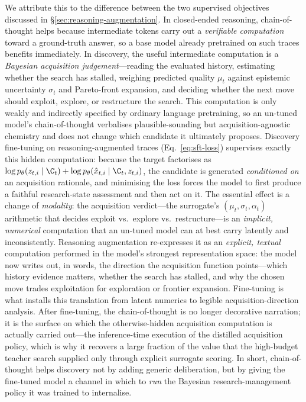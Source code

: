 We attribute this to the difference between the two supervised objectives discussed in
\S\ref{sec:reasoning-augmentation}. In closed-ended reasoning, chain-of-thought helps because intermediate
tokens carry out a \emph{verifiable computation} toward a ground-truth answer, so a base model already
pretrained on such traces benefits immediately. In discovery, the useful intermediate computation is a
\emph{Bayesian acquisition judgement}---reading the evaluated history, estimating whether the search has
stalled, weighing predicted quality $\mu_t$ against epistemic uncertainty $\sigma_t$ and Pareto-front
expansion, and deciding whether the next move should exploit, explore, or restructure the search. This
computation is only weakly and indirectly specified by ordinary language pretraining, so an un-tuned model's
chain-of-thought verbalises plausible-sounding but acquisition-agnostic chemistry and does not change which
candidate it ultimately proposes. Discovery fine-tuning on reasoning-augmented traces
(Eq.~\eqref{eq:sft-loss}) supervises exactly this hidden computation: because the target factorises as
$\log p_\theta(z_{t,i}\mid\C_t) + \log p_\theta(\hat{x}_{t,i}\mid\C_t,z_{t,i})$, the candidate is generated
\emph{conditioned on} an acquisition rationale, and minimising the loss forces the model to first produce a
faithful research-state assessment and then act on it. The essential effect is a change of \emph{modality}:
the acquisition verdict---the surrogate's $(\mu_t,\sigma_t,\alpha_t)$ arithmetic that decides exploit
vs.\ explore vs.\ restructure---is an \emph{implicit, numerical} computation that an un-tuned model can at best
carry latently and inconsistently. Reasoning augmentation re-expresses it as an \emph{explicit, textual}
computation performed in the model's strongest representation space: the model now writes out, in words, the
direction the acquisition function points---which history evidence matters, whether the search has stalled, and
why the chosen move trades exploitation for exploration or frontier expansion. Fine-tuning is what installs this
translation from latent numerics to legible acquisition-direction analysis. After fine-tuning, the
chain-of-thought is no longer decorative narration; it is the surface on which the otherwise-hidden acquisition
computation is actually carried out---the inference-time execution of the distilled acquisition policy, which is
why it recovers a large fraction of the value that the high-budget teacher search supplied only through explicit
surrogate scoring. In short, chain-of-thought helps discovery not by adding generic deliberation, but by giving
the fine-tuned model a channel in which to \emph{run} the Bayesian research-management policy it was trained to
internalise.


